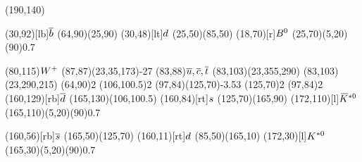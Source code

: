 \documentclass{standalone}
\begin{document}
\begin{axopicture}(190,140)

  \Text(30,92)[lb]{${\overline {{b}}}$}                           %
  \Line[arrow](64,90)(25,90)                               %
  \Text(30,48)[lt]{${d}$}                              %
  \Line[arrow](25,50)(85,50)                               %
  \Text(18,70)[r]{${{B}^0}$}                                   %
  \GOval(25,70)(5,20)(90){0.7}                             %
                                                           
  \Text(80,115){\small{${W^+}$}}                             %
  \PhotonArc(87,87)(23,35,173){-2}{7}                      %
  \Text(83,88){${\overline {{u}}}, {\overline {{c}}}, {\overline {{t}}}$}       %
  \Arc[arrow,clockwise,arrowpos=0.4](83,103)(23,355,290)   %
  \Arc[arrow,clockwise,arrowpos=0.4](83,103)(23,290,215)   %
  \Vertex(64,90){2}                                        %
  \Vertex(106,100.5){2}                                    %
  \Gluon(97,84)(125,70){-3.5}{3}                           %
  \Vertex(125,70){2}                                       %
  \Vertex(97,84){2}                                        %
  \Text(160,129)[rb]{${\overline {{d}}}$}                         %
  \Line[arrow](165,130)(106,100.5)                         %
  \Text(160,84)[rt]{${s}$}                             %
  \Line[arrow](125,70)(165,90)                             %
  \Text(172,110)[l]{${{\kern 0.18em\overline{\kern -0.18em K}}{}^{*0}}$}                            %
  \GOval(165,110)(5,20)(90){0.7}                           %
                                                           
  \Text(160,56)[rb]{${\overline {{s}}}$}                          %
  \Line[arrow](165,50)(125,70)                             %
  \Text(160,11)[rt]{${d}$}                             %
  \Line[arrow](85,50)(165,10)                              %
  \Text(172,30)[l]{${{K}^{*0}}$}                              %
  \GOval(165,30)(5,20)(90){0.7}                            %
                                                           
\end{axopicture}
\end{document}
